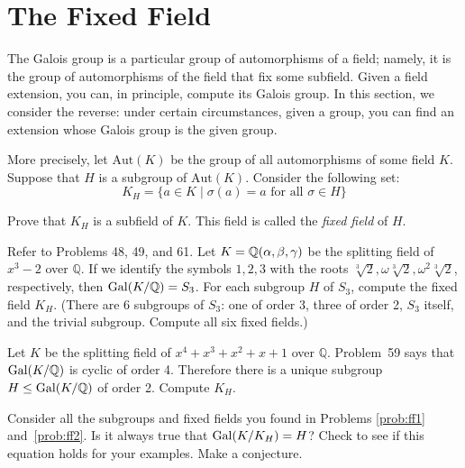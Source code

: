 \section{The Fixed Field}

The Galois group is a particular group of automorphisms of a field; namely, it is the group of automorphisms of the field that fix some subfield.  Given a field extension, you can, in principle, compute its Galois group.  In this section, we consider the reverse: under certain circumstances, given a group, you can find an extension whose Galois group is the given group. \smallskip

More precisely, let $\mbox{Aut}(K)$ be the group of all automorphisms of some field $K$.  Suppose that $H$ is a subgroup of $\mbox{Aut}(K)$.  Consider the following set:
$$K_H = \{a \in K \mid \sigma(a) = a \mbox{ for all } \sigma \in H\}$$

\begin{problem}
 Prove that $K_H$ is a subfield of $K$.  This field is called the \emph{fixed field} of $H$.
\end{problem}



\begin{problem}\label{prob:ff1}
Refer to Problems 48, 49, and 61. Let $K=\mathbb{Q}(\alpha,\beta,\gamma)$ be the splitting field of $x^3-2$ over $\mathbb{Q}$.  If we identify the symbols $1,2,3$ with the roots $\sqrt[3]{2}, \omega\sqrt[3]{2}, \omega^2\sqrt[3]{2}$, respectively, then $\operatorname{Gal}(K/\mathbb{Q}) = S_3$.  For each subgroup $H$ of $S_3$, compute the fixed field $K_H$.  (There are 6 subgroups of $S_3$: one of order 3, three of order 2, $S_3$ itself, and the trivial subgroup.  Compute all six fixed fields.)
\end{problem}



\begin{problem}\label{prob:ff2}
Let $K$ be the splitting field of $x^4+x^3+x^2+x+1$ over $\mathbb{Q}$.  Problem~59 says that $\operatorname{Gal}(K/\mathbb{Q})$ is cyclic of order 4.  Therefore there is a unique subgroup $H \leq \operatorname{Gal}(K/\mathbb{Q})$ of order 2.  Compute $K_H$.
\end{problem}



\begin{problem}
    Consider all the subgroups and fixed fields you found in Problems \ref{prob:ff1} and~\ref{prob:ff2}.  Is it always true that $\operatorname{Gal}(K/K_H) = H$?  Check to see if this equation holds for your examples. Make a conjecture.
\end{problem}



